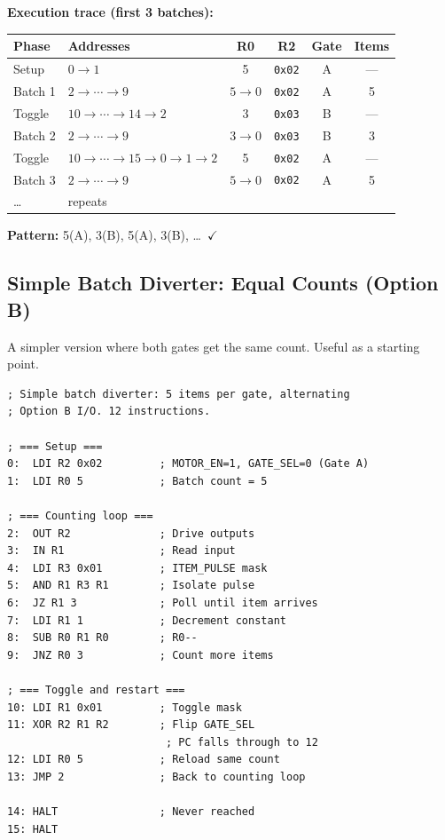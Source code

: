 \documentclass[11pt,a4paper]{article}
\begin{document}
\textbf{Execution trace (first 3 batches):}

\begin{table}[H]
\centering
\small
\begin{tabular}{@{}llcccc@{}}
\toprule
\textbf{Phase} & \textbf{Addresses} & \textbf{R0} & \textbf{R2} & \textbf{Gate} & \textbf{Items} \\
\midrule
Setup   & $0 \rightarrow 1$                   & 5         & \texttt{0x02} & A & --- \\
Batch 1 & $2 \rightarrow \cdots \rightarrow 9$ & $5 \rightarrow 0$ & \texttt{0x02} & A & 5 \\
Toggle  & $10 \rightarrow \cdots \rightarrow 14 \rightarrow 2$ & 3 & \texttt{0x03} & B & --- \\
Batch 2 & $2 \rightarrow \cdots \rightarrow 9$ & $3 \rightarrow 0$ & \texttt{0x03} & B & 3 \\
Toggle  & $10 \rightarrow \cdots \rightarrow 15 \rightarrow 0 \rightarrow 1 \rightarrow 2$ & 5 & \texttt{0x02} & A & --- \\
Batch 3 & $2 \rightarrow \cdots \rightarrow 9$ & $5 \rightarrow 0$ & \texttt{0x02} & A & 5 \\
\ldots  & repeats & & & & \\
\bottomrule
\end{tabular}
\end{table}

\textbf{Pattern:} 5(A), 3(B), 5(A), 3(B), \ldots\ $\checkmark$

\subsection{Simple Batch Diverter: Equal Counts (Option B)}

A simpler version where both gates get the same count. Useful as a starting point.

\begin{lstlisting}
; Simple batch diverter: 5 items per gate, alternating
; Option B I/O. 12 instructions.

; === Setup ===
0:  LDI R2 0x02         ; MOTOR_EN=1, GATE_SEL=0 (Gate A)
1:  LDI R0 5            ; Batch count = 5

; === Counting loop ===
2:  OUT R2              ; Drive outputs
3:  IN R1               ; Read input
4:  LDI R3 0x01         ; ITEM_PULSE mask
5:  AND R1 R3 R1        ; Isolate pulse
6:  JZ R1 3             ; Poll until item arrives
7:  LDI R1 1            ; Decrement constant
8:  SUB R0 R1 R0        ; R0--
9:  JNZ R0 3            ; Count more items

; === Toggle and restart ===
10: LDI R1 0x01         ; Toggle mask
11: XOR R2 R1 R2        ; Flip GATE_SEL
                         ; PC falls through to 12
12: LDI R0 5            ; Reload same count
13: JMP 2               ; Back to counting loop

14: HALT                ; Never reached
15: HALT
\end{lstlisting}
\end{document}
